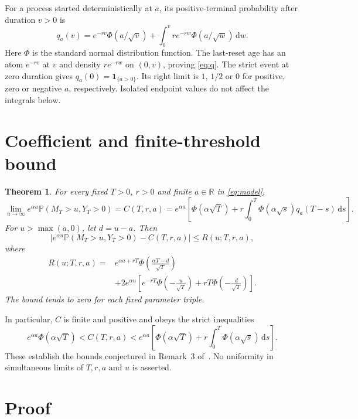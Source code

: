 \documentclass[11pt,a4paper]{article}
\newcommand{\Prob}{\mathbb P}
\newcommand{\dd}{\,\mathrm d}
\newtheorem{theorem}{Theorem}
\begin{document}
For a process started deterministically at $a$, its positive-terminal probability
after duration $v>0$ is
\begin{equation}\label{eq:q}
q_a(v)=e^{-rv}\Phi(a/\sqrt v)
       +\int_0^v r e^{-rw}\Phi(a/\sqrt w)\dd w.
\end{equation}
Here $\Phi$ is the standard normal distribution function. The last-reset age has
an atom $e^{-rv}$ at $v$ and density $re^{-rw}$ on $(0,v)$, proving
\eqref{eq:q}. The strict event at zero duration gives $q_a(0)=\mathbf1_{\{a>0\}}$.
Its right limit is $1$, $1/2$ or $0$ for positive, zero or negative $a$,
respectively. Isolated endpoint values do not affect the integrals below.

\section{Coefficient and finite-threshold bound}
\begin{theorem}\label{thm:main}
For every fixed $T>0$, $r>0$ and finite $a\in\mathbb R$ in \eqref{eq:model},
\begin{equation}\label{eq:C}
\lim_{u\to\infty}e^{\alpha u}\Prob(M_T>u,Y_T>0)
=C(T,r,a)
=e^{\alpha a}\left[
\Phi(\alpha\sqrt T)+r\int_0^T\Phi(\alpha\sqrt s)q_a(T-s)\dd s\right].
\end{equation}
For $u>\max(a,0)$, let $d=u-a$. Then
\begin{equation}\label{eq:error}
\left|e^{\alpha u}\Prob(M_T>u,Y_T>0)-C(T,r,a)\right|
\leq R(u;T,r,a),
\end{equation}
where
\begin{align}\label{eq:R}
R(u;T,r,a)
={}&e^{\alpha a+rT}\Phi\!\left(\frac{\alpha T-d}{\sqrt T}\right)\nonumber\\
&+2e^{\alpha u}\left[
e^{-rT}\Phi\!\left(-\frac u{\sqrt T}\right)
+rT\Phi\!\left(-\frac d{\sqrt T}\right)\right].
\end{align}
The bound tends to zero for each fixed parameter triple.
\end{theorem}
In particular, $C$ is finite and positive and obeys the strict inequalities
\begin{equation}\label{eq:bounds}
e^{\alpha a}\Phi(\alpha\sqrt T)
<C(T,r,a)<
e^{\alpha a}\left[\Phi(\alpha\sqrt T)
+r\int_0^T\Phi(\alpha\sqrt s)\dd s\right].
\end{equation}
These establish the bounds conjectured in Remark~3 of~\cite{DHM}. No uniformity
in simultaneous limits of $T,r,a$ and $u$ is asserted.

\section{Proof}
\end{document}
